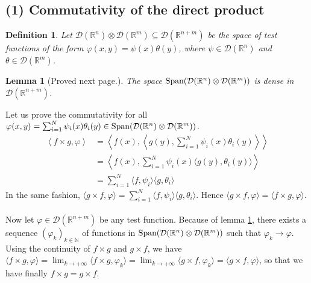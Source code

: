 \documentclass[11pt,a4paper]{article}
\newtheorem{defi}{Definition}
\newtheorem{lem}{Lemma}
\newcommand{\ph}{\varphi}
\newcommand{\N}{\mathbb{N}}
\newcommand{\R}{\mathbb{R}}
\newcommand{\1}{\mathbbm{1}}
\newcommand{\D}{\mathcal{D}}
\begin{document}
\subsection*{(1) Commutativity of the direct product}
\begin{defi}
Let $\D(\R^n) \otimes \D(\R^m) \subseteq \D(\R^{n+m})$ be the space of test functions of the form $\ph(x,y) = \psi(x)\theta(y)$, where $\psi \in \D(\R^n)$ and $\theta \in \D(\R^m)$.
\end{defi}
\begin{lem}[Proved next page.] \label{density}
The space $\textnormal{Span}(\D(\R^n) \otimes \D(\R^m))$ is dense in $\D(\R^{n+m})$.
\end{lem}
Let us prove the commutativity for all $\ph(x,y) = \sum_{i=1}^N \psi_i(x)\theta_i(y) \in \textnormal{Span}(\D(\R^n) \otimes \D(\R^m))$.
\begin{align*}
\left\langle f \times g  , \ph \right\rangle
& = \left\langle f(x) , \left\langle g(y) , \sum_{i=1}^N \psi_i(x)\theta_i(y) \right\rangle \right\rangle \\
& = \left\langle f(x) , \sum_{i=1}^N \psi_i(x) \langle g(y) , \theta_i(y) \rangle \right\rangle \\
& = \sum_{i=1}^N \langle f , \psi_i \rangle \langle g , \theta_i \rangle
\end{align*}
In the same fashion, $\langle g \times f , \ph \rangle = \sum_{i=1}^N \langle f,\psi_i \rangle \langle g , \theta_i \rangle$. Hence $\langle g \times f , \ph \rangle = \langle f \times g , \ph \rangle$.\\\\
Now let $\ph \in \D(\R^{n+m})$ be any test function. Because of lemma \ref{density}, there exists a sequence $(\ph_k)_{k\in\N}$ of functions in $\textnormal{Span}(\D(\R^n) \otimes \D(\R^m))$ such that $\ph_k \to \ph$. Using the continuity of $f \times g$ and $g \times f$, we have $\langle f \times g , \ph \rangle = \lim_{k\to +\infty} \langle f \times g , \ph_k \rangle = \lim_{k\to +\infty} \langle g \times f , \ph_k \rangle = \langle g \times f , \ph \rangle$, so that we have finally $f \times g = g \times f$.
\end{document}
